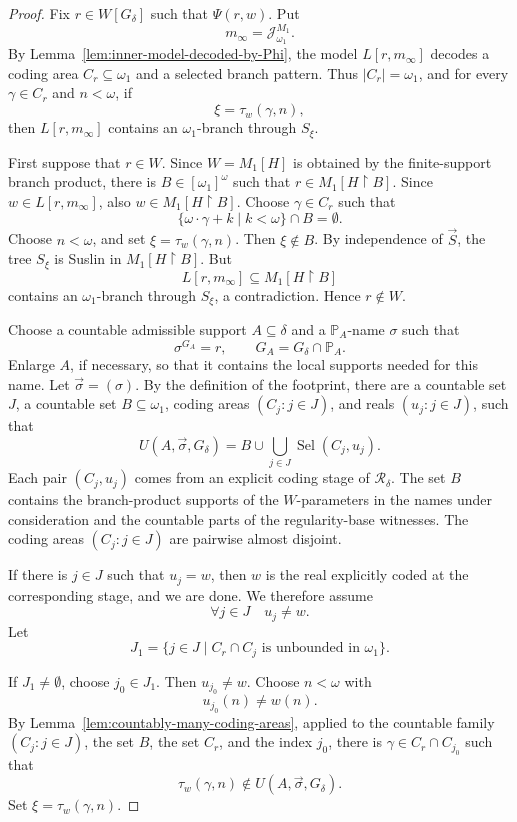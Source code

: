 \documentclass[a4paper,11pt]{article}
\begin{document}
\begin{proof}
Fix \(r\in W[G_\delta]\) such that \(\Psi(r,w)\).  Put
\[
   m_\infty=\mathcal J^{M_1}_{\omega_1}.
\]
By Lemma~\ref{lem:inner-model-decoded-by-Phi}, the model
\(L[r,m_\infty]\) decodes a coding area \(C_r\subseteq\omega_1\) and a selected
branch pattern.  Thus \(|C_r|=\omega_1\), and for every \(\gamma\in C_r\) and
\(n<\omega\), if
\[
   \xi=\tau_w(\gamma,n),
\]
then \(L[r,m_\infty]\) contains an \(\omega_1\)-branch through \(S_\xi\).

First suppose that \(r\in W\).  Since \(W=M_1[H]\) is obtained by the
finite-support branch product, there is \(B\in[\omega_1]^\omega\) such that
\(r\in M_1[H\upharpoonright B]\).  Since \(w\in L[r,m_\infty]\), also
\(w\in M_1[H\upharpoonright B]\).  Choose \(\gamma\in C_r\) such that
\[
   \{\omega\cdot\gamma+k\mid k<\omega\}\cap B=\emptyset.
\]
Choose \(n<\omega\), and set \(\xi=\tau_w(\gamma,n)\).  Then
\(\xi\notin B\).  By independence of \(\vec S\), the tree \(S_\xi\) is Suslin in
\(M_1[H\upharpoonright B]\).  But
\[
   L[r,m_\infty]\subseteq M_1[H\upharpoonright B]
\]
contains an \(\omega_1\)-branch through \(S_\xi\), a contradiction.  Hence
\(r\notin W\).

Choose a countable admissible support \(A\subseteq\delta\) and a
\(\mathbb P_A\)-name \(\sigma\) such that
\[
   \sigma^{G_A}=r,
   \qquad G_A=G_\delta\cap\mathbb P_A.
\]
Enlarge \(A\), if necessary, so that it contains the local supports needed for
this name.  Let \(\vec\sigma=(\sigma)\).  By the definition of the footprint,
there are a countable set \(J\), a countable set \(B\subseteq\omega_1\), coding
areas \((C_j:j\in J)\), and reals \((u_j:j\in J)\), such that
\[
   U(A,\vec\sigma,G_\delta)
   =
   B\cup\bigcup_{j\in J}\operatorname{Sel}(C_j,u_j).
\]
Each pair \((C_j,u_j)\) comes from an explicit coding stage of
\(\mathcal R_\delta\).  The set \(B\) contains the branch-product supports of the
\(W\)-parameters in the names under consideration and the countable parts of the
regularity-base witnesses.  The coding areas \((C_j:j\in J)\) are pairwise
almost disjoint.

If there is \(j\in J\) such that \(u_j=w\), then \(w\) is the real explicitly
coded at the corresponding stage, and we are done.  We therefore assume
\[
   \forall j\in J\quad u_j\ne w.
\]
Let
\[
   J_1=\{j\in J\mid C_r\cap C_j\text{ is unbounded in }\omega_1\}.
\]

If \(J_1\ne\emptyset\), choose \(j_0\in J_1\).  Then \(u_{j_0}\ne w\).  Choose
\(n<\omega\) with
\[
   u_{j_0}(n)\ne w(n).
\]
By Lemma~\ref{lem:countably-many-coding-areas}, applied to the countable family
\((C_j:j\in J)\), the set \(B\), the set \(C_r\), and the index \(j_0\), there
is \(\gamma\in C_r\cap C_{j_0}\) such that
\[
   \tau_w(\gamma,n)\notin U(A,\vec\sigma,G_\delta).
\]
Set \(\xi=\tau_w(\gamma,n)\).


\end{proof}
\end{document}
